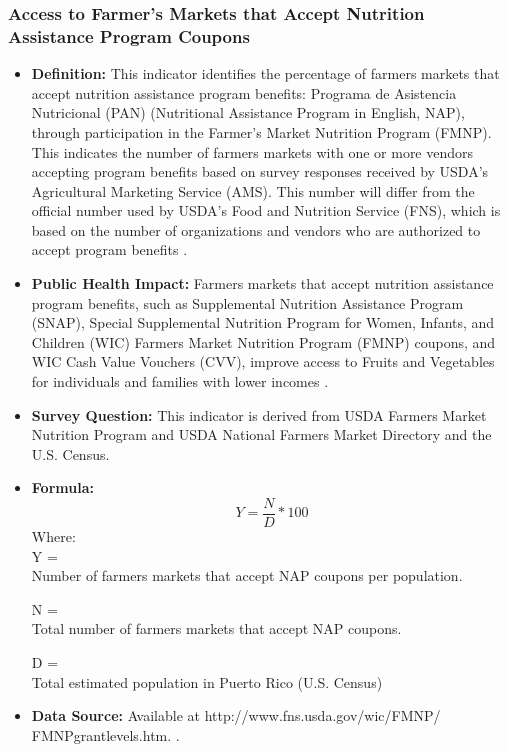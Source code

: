 \documentclass[12pt,letterpaper]{report}
\begin{document}
\subsubsection{Access to Farmer's Markets that Accept Nutrition Assistance Program Coupons} 
	\begin{itemize}
		\item \textbf{Definition:} This indicator identifies the percentage of farmers markets that accept nutrition assistance program benefits: Programa de Asistencia Nutricional (PAN) (Nutritional Assistance Program in English, NAP), through participation in the Farmer's Market Nutrition Program (FMNP). This indicates the number of farmers markets with one or more vendors accepting program benefits based on survey responses received by USDA’s Agricultural Marketing Service (AMS). This number will differ from the official number used by USDA’s Food and Nutrition Service (FNS), which is based on the number of organizations and vendors who are authorized to accept program benefits \cite{fruitandvegetable2013}.
		
		\item \textbf{Public Health Impact:} Farmers markets that accept nutrition assistance program benefits, such as Supplemental Nutrition Assistance Program (SNAP), Special Supplemental Nutrition Program for Women, Infants, and Children (WIC) Farmers Market Nutrition Program (FMNP) coupons, and WIC Cash Value Vouchers (CVV), improve access to Fruits and Vegetables for individuals and families with lower incomes \cite{story2008creating} \cite{fox2004effects} \cite{kendall1996relationship} \cite{black2004special} \cite{dunifon2003influences}.
		\item \textbf{Survey Question:}
		This indicator is derived from USDA Farmers Market Nutrition Program and USDA National Farmers Market Directory and the U.S. Census. 
		\item \textbf{Formula:} 
			\begin{equation}
				Y = \frac{N}{D} *100
			\end{equation}
Where: \\
			Y = \\ Number of farmers markets that accept NAP coupons per population.
			
			N = \\ Total number of farmers markets that accept NAP coupons. 
			
			D = \\ Total estimated population in Puerto Rico (U.S. Census)
			
		\item \textbf{Data Source:} Available at http://www.fns.usda.gov/wic/FMNP/ FMNPgrantlevels.htm. \cite{fruitandvegetable2013}.
	\end{itemize}
\end{document}
